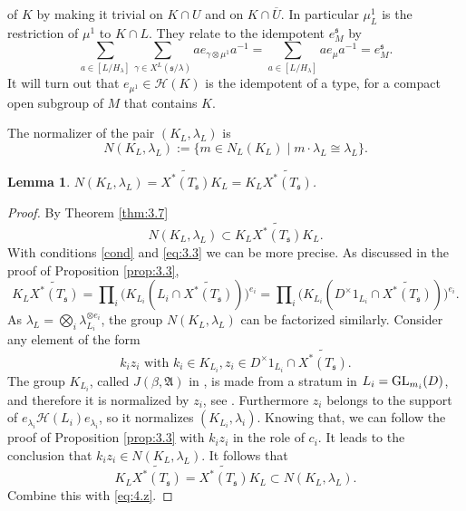 \documentclass[11pt]{amsart}
\newtheorem{lem}[thm]{Lemma}
\theoremstyle{definition}
\begin{document}
of $K$ by making it trivial on $K \cap U$ and on $K \cap \overline{U}$. 
In particular $\mu_L^1$ is the restriction of $\mu^1$ to $K \cap L$.
They relate to the idempotent $e^{{\mathfrak s}}_M$ by
\[
\sum_{a \in [L / H_\lambda]} \sum_{\gamma \in X^L ({{\mathfrak s}} / \lambda)} a e_{\gamma 
\otimes \mu^1} a^{-1} = \sum_{a \in [L / H_\lambda]} a e_{\mu } a^{-1} = e^{{\mathfrak s}}_M .
\]
It will turn out that $e_{\mu^1} \in {{\mathcal H}} (K)$ is the idempotent of a type, for a
compact open subgroup of $M$ that contains $K$. 

The normalizer of the pair $(K_L,\lambda_L)$ is \label{i:38}
\[
N(K_L,\lambda_L) := \{ m \in N_L (K_L) \mid m \cdot \lambda_L \cong \lambda_L \} .
\]
\begin{lem}\label{lem:4.19}
$N(K_L,\lambda_L) = \widetilde{X^* (T_{{\mathfrak s}})} K_L = K_L \widetilde{X^* (T_{{\mathfrak s}})}$.
\end{lem}
\begin{proof}
By Theorem \ref{thm:3.7} 
\begin{equation}\label{eq:4.z}
N(K_L,\lambda_L) \subset K_L \widetilde{X^* (T_{{\mathfrak s}})} K_L. 
\end{equation}
With conditions \ref{cond} and \eqref{eq:3.3}
we can be more precise. As discussed in the proof of Proposition \ref{prop:3.3},
\begin{equation}
K_L \widetilde{X^* (T_{{\mathfrak s}})} = \prod\nolimits_i \Big( K_{L_i} (L_i \cap 
\widetilde{X^* (T_{{\mathfrak s}})}) \Big)^{e_i} = \prod\nolimits_i \Big( K_{L_i} 
( D^\times 1_{L_i} \cap \widetilde{X^* (T_{{\mathfrak s}})} ) \Big)^{e_i} .
\end{equation}
As $\lambda_L = \bigotimes\nolimits_i \lambda_{L_i}^{\otimes e_i}$, the group 
$N(K_L,\lambda_L)$ can be factorized similarly.
Consider any element of the form
\begin{equation}
k_i z_i \text{ with } k_i \in K_{L_i}, 
z_i \in D^\times 1_{L_i} \cap \widetilde{X^* (T_{{\mathfrak s}})}.
\end{equation}
The group $K_{L_i}$, called $J(\beta,\mathfrak A)$ in \cite{Sec3}, is made from 
a stratum in $L_i = {{\rm GL}}_{m_i}(D)$, and therefore it is normalized by $z_i$, see
\cite[\S 2.3]{Sec3}. Furthermore $z_i$ 
belongs to the support of $e_{\lambda_i} {{\mathcal H}} (L_i) e_{\lambda_i}$,
so it normalizes $(K_{L_i},\lambda_i)$. Knowing that, we can follow the proof of 
Proposition \ref{prop:3.3} with $k_i z_i$ in the role of $c_i$. It leads to the 
conclusion that $k_i z_i \in N(K_L,\lambda_L)$. It follows that 
\[
K_L \widetilde{X^* (T_{{\mathfrak s}})} = \widetilde{X^* (T_{{\mathfrak s}})} K_L \subset N(K_L,\lambda_L) .
\]
Combine this with \eqref{eq:4.z}.
\end{proof}
\end{document}
